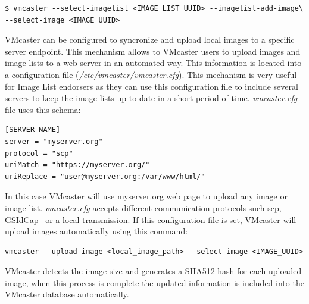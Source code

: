 \documentclass[oribibl]{llncs_Ibergrid2013}
\begin{document}
\begin{verbatim}
$ vmcaster --select-imagelist <IMAGE_LIST_UUID> --imagelist-add-image\ 
--select-image <IMAGE_UUID>
\end{verbatim}

VMcaster can be configured to syncronize and upload local images to a specific server endpoint. This mechanism allows to VMcaster users to upload images and image lists to a web server in an automated way.
This information is located into a configuration file (\textit{/etc/vmcaster/vmcaster.cfg}). This mechanism is very useful for Image List endorsers as they can use this configuration file to include several servers to keep the image lists up to date in a short period of time.
\textit{vmcaster.cfg} file uses this schema:
\begin{verbatim}
[SERVER NAME]
server = "myserver.org"
protocol = "scp"
uriMatch = "https://myserver.org/"
uriReplace = "user@myserver.org:/var/www/html/"
\end{verbatim}
In this case VMcaster will use \url{myserver.org} web page to upload any image or image list. 
\textit{vmcaster.cfg} accepts different communication protocols such scp, GSIdCap~\cite{dcache} or a local transmission. If this configuration file is set, VMcaster will upload images automatically using this command:

\begin{verbatim}
vmcaster --upload-image <local_image_path> --select-image <IMAGE_UUID>
\end{verbatim}

VMcaster detects the image size and generates a SHA512 hash for each uploaded image, when this process is complete the updated information is included into the VMcaster database automatically.
\end{document}
